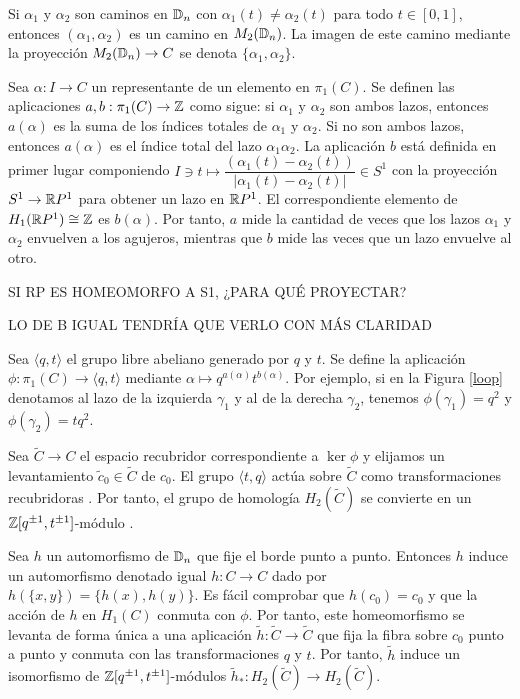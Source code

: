 \documentclass[TFG.tex]{subfiles}
\begin{document}

Si $\alpha_1$ y $\alpha_2$ son caminos en $\mathbb{D}_n$ con $\alpha_1(t)\neq\alpha_2(t)$ para todo $t\in[0,1]$, entonces $(\alpha_1,\alpha_2)$ es un camino en $M_2(\mathbb{D}_n)$. La imagen de este camino mediante la proyección $M_2(\mathbb{D}_n)\to C$ se denota $\{\alpha_1,\alpha_2\}$.

Sea $\alpha:I\to C$ un representante de un elemento en $\pi_1(C)$. Se definen las aplicaciones $a,b:\pi_1(C)\to\mathbb{Z}$ como sigue: si $\alpha_1$ y $\alpha_2$ son ambos lazos, entonces $a(\alpha)$ es la suma de los índices totales de $\alpha_1$ y $\alpha_2$. Si no son ambos lazos, entonces $a(\alpha)$ es el índice total del lazo $\alpha_1\alpha_2$. La aplicación $b$ está definida en primer lugar componiendo $I\ni t\mapsto \dfrac{(\alpha_1(t)-\alpha_2(t))}{|\alpha_1(t)-\alpha_2(t)|}\in S^1$ con la proyección $S^1\to \mathbb{R} P^1$ para obtener un lazo en $\mathbb{R} P^1$. El correspondiente elemento de $H_1(\mathbb{R} P^1)\cong\mathbb{Z}$ es $b(\alpha)$. Por tanto, $a$ mide la cantidad de veces que los lazos $\alpha_1$ y $\alpha_2$ envuelven a los agujeros, mientras que $b$ mide las veces que un lazo envuelve al otro.

SI RP ES HOMEOMORFO A S1, ¿PARA QUÉ PROYECTAR? 

LO DE B IGUAL TENDRÍA QUE VERLO CON MÁS CLARIDAD

Sea $\langle q,t\rangle$ el grupo libre abeliano  generado por $q$ y $t$. Se define la aplicación $\phi:\pi_1(C)\to\langle q,t\rangle$ mediante $\alpha\mapsto q^{a(\alpha)}t^{b(\alpha)}$. Por ejemplo, si en la Figura \ref{loop} denotamos al lazo de la izquierda $\gamma_1$ y al de la derecha $\gamma_2$, tenemos $\phi(\gamma_1)=q^2$ y $\phi(\gamma_2)=tq^2$. 

Sea $\tilde{C}\to C$ el espacio recubridor correspondiente a $\ker\phi$ y elijamos un levantamiento $\tilde{c}_0\in\tilde{C}$ de $c_0$. El grupo $\langle t,q\rangle$ actúa sobre $\tilde{C}$ como transformaciones recubridoras \cite{thesis}. Por tanto, el grupo de homología $H_2(\tilde{C})$ se convierte en un $\mathbb{Z}[q^{\pm 1},t^{\pm 1}]$-módulo \cite{nundam}.

Sea $h$ un automorfismo de $\mathbb{D}_n$ que fije el borde punto a punto. Entonces $h$ induce un automorfismo denotado igual $h:C\to C$ dado por $h(\{x,y\})=\{h(x),h(y)\}$. Es fácil comprobar que $h(c_0)=c_0$ y que la acción de $h$ en $H_1(C)$ conmuta con $\phi$. Por tanto, este homeomorfismo se levanta de forma única a una aplicación $\tilde{h}:\tilde{C}\to\tilde{C}$ que fija la fibra sobre $c_0$ punto a punto y conmuta con las transformaciones $q$ y $t$. Por tanto, $\tilde{h}$ induce un isomorfismo de $\mathbb{Z}[q^{\pm 1},t^{\pm 1}]$-módulos $\tilde{h}_*:H_2(\tilde{C})\to H_2(\tilde{C})$.
\end{document}
